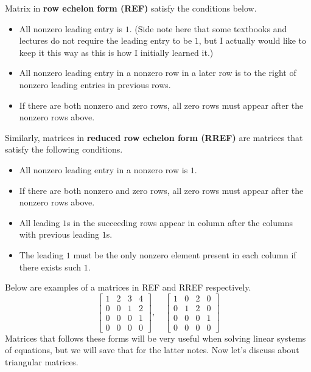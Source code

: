 \documentclass[../main.tex]{subfiles}
\begin{document}
\begin{definition}
Matrix in \textbf{row echelon form (REF)} satisfy the conditions
below.
\begin{itemize}[noitemsep]
\item
All nonzero leading entry is $1$. (Side note here that some textbooks
and lectures do not require the leading entry to be $1$, but I
actually would like to keep it this way as this is how I initially
learned it.)
\item
All nonzero leading entry in a nonzero row in a later row is to the
right of nonzero leading entries in previous rows.
\item
If there are both nonzero and zero rows, all zero rows must appear
after the nonzero rows above.
\end{itemize}

Similarly, matrices in \textbf{reduced row echelon form (RREF)}
are matrices that satisfy the following conditions.
\begin{itemize}[noitemsep]
\item
All nonzero leading entry in a nonzero row is $1$.
\item
If there are both nonzero and zero rows, all zero rows must appear
after the nonzero rows above.
\item
All leading $1$s in the succeeding rows appear in column after the
columns with previous leading $1$s.
\item
The leading $1$ must be the only nonzero element present in each
column if there exists such $1$.
\end{itemize}
\end{definition}

Below are examples of a matrices in REF and RREF respectively.
\[
\begin{bmatrix}
    1 & 2 & 3 & 4 \\
    0 & 0 & 1 & 2 \\
    0 & 0 & 0 & 1 \\
    0 & 0 & 0 & 0
\end{bmatrix},
\quad
\begin{bmatrix}
    1 & 0 & 2 & 0 \\
    0 & 1 & 2 & 0 \\
    0 & 0 & 0 & 1 \\
    0 & 0 & 0 & 0
\end{bmatrix}
\]
Matrices that follows these forms will be very useful when solving
linear systems of equations, but we will save that for the latter
notes. Now let's discuss about triangular matrices.
\end{document}

